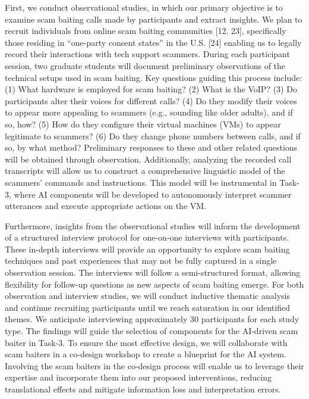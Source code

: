 \begin{itemize}
First, we conduct observational studies, in which our primary objective is to examine scam baiting calls
made by participants and extract insights. We plan to recruit individuals from online scam baiting
communities [12, 23], specifically those residing in “one-party consent states” in the U.S. [24] enabling
us to legally record their interactions with tech support scammers. During each participant session, two
graduate students will document preliminary observations of the technical setups used in scam baiting.
Key questions guiding this process include: (1) What hardware is employed for scam baiting? (2) What is
the VoIP? (3) Do participants alter their voices for different calls? (4) Do they modify their voices to
appear more appealing to scammers (e.g., sounding like older adults), and if so, how? (5) How do they
configure their virtual machines (VMs) to appear legitimate to scammers? (6) Do they change phone
numbers between calls, and if so, by what method? Preliminary responses to these and other related
questions will be obtained through observation. Additionally, analyzing the recorded call transcripts will
allow us to construct a comprehensive linguistic model of the scammers’ commands and instructions.
This model will be instrumental in Task-3, where AI components will be developed to autonomously
interpret scammer utterances and execute appropriate actions on the VM.


Furthermore, insights from the observational studies will inform the development of a structured
interview protocol for one-on-one interviews with participants. These in-depth interviews will provide an
opportunity to explore scam baiting techniques and past experiences that may not be fully captured in a
single observation session. The interviews will follow a semi-structured format, allowing flexibility for
follow-up questions as new aspects of scam baiting emerge. For both observation and interview studies,
we will conduct inductive thematic analysis and continue recruiting participants until we reach saturation
in our identified themes. We anticipate interviewing approximately 30 participants for each study type.
The findings will guide the selection of components for the AI-driven scam baiter in Task-3. To ensure
the most effective design, we will collaborate with scam baiters in a co-design workshop to create a
blueprint for the AI system. Involving the scam baiters in the co-design process will enable us to leverage
their expertise and incorporate them into our proposed interventions, reducing translational effects and
mitigate information loss and interpretation errors.


\end{itemize}